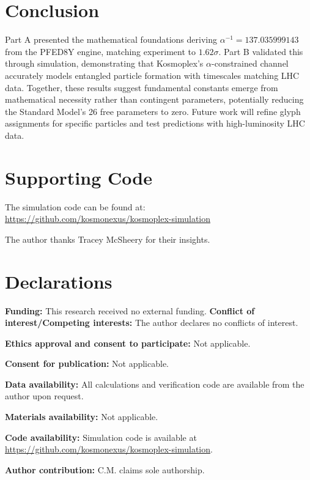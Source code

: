 \documentclass[pdflatex,sn-mathphys-num]{sn-jnl}
\theoremstyle{thmstyleone}
\theoremstyle{thmstyletwo}
\theoremstyle{thmstylethree}
\begin{document}
\section{Conclusion}\label{sec:s2-conclusions}
Part A presented the mathematical foundations deriving $\alpha^{-1} = 137.035999143$ from the PFED8Y engine, matching experiment to $1.62\sigma$. Part B validated this through simulation, demonstrating that Kosmoplex's $\alpha$-constrained channel accurately models entangled particle formation with timescales matching LHC data. Together, these results suggest fundamental constants emerge from mathematical necessity rather than contingent parameters, potentially reducing the Standard Model's 26 free parameters to zero. Future work will refine glyph assignments for specific particles and test predictions with high-luminosity LHC data.

\section*{Supporting Code}
The simulation code can be found at: \url{https://github.com/kosmonexus/kosmoplex-simulation}

\backmatter
{}
The author thanks Tracey McSheery for their insights.

\section*{Declarations}
\noindent\textbf{Funding:} This research received no external funding.
\noindent\textbf{Conflict of interest/Competing interests:} The author declares no conflicts of interest.

\noindent\textbf{Ethics approval and consent to participate:} Not applicable.

\noindent\textbf{Consent for publication:} Not applicable.

\noindent\textbf{Data availability:} All calculations and verification code are available from the author upon request.

\noindent\textbf{Materials availability:} Not applicable.

\noindent\textbf{Code availability:} Simulation code is available at \url{https://github.com/kosmonexus/kosmoplex-simulation}.

\noindent\textbf{Author contribution:} C.M. claims sole authorship.
\end{document}

